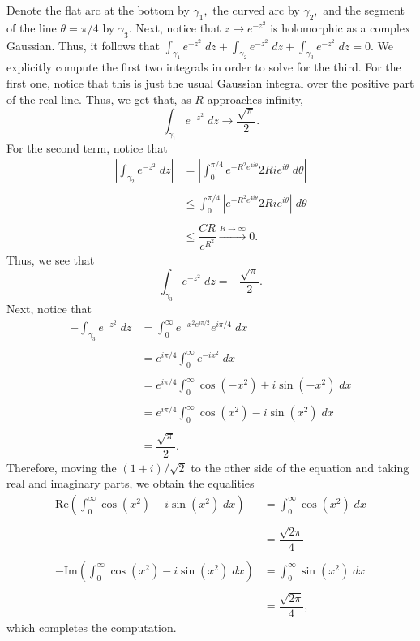 \documentclass[12pt]{article}
\newenvironment{statement}[1]{\smallskip\noindent\color{black}{\bf #1.}}{}
\theoremstyle{definition}
\theoremstyle{remark}
\begin{document}
\begin{statement}{2.1}
Denote the flat arc at the bottom by $\gamma_{1},$ the curved arc by $\gamma_{2},$ and the segment of the line $\theta = \pi/4$ by $\gamma_{3}.$ Next, notice that $z \mapsto e^{-z^{2}}$ is holomorphic as a complex Gaussian. Thus, it follows that $\int_{\gamma_{1}}e^{-z^{2}}\;dz + \int_{\gamma_{2}}e^{-z^{2}}\;dz + \int_{\gamma_{3}}e^{-z^{2}}\;dz = 0.$ We explicitly compute the first two integrals in order to solve for the third. For the first one, notice that this is just the usual Gaussian integral over the positive part of the real line. Thus, we get that, as $R$ approaches infinity, 
\[\int_{\gamma_{1}}e^{-z^{2}}\;dz \to \dfrac{\sqrt{\pi}}{2}.\]
For the second term, notice that
\begin{align*}
\left |\int_{\gamma_{2}}e^{-z^{2}}\;dz\right | &= \left |\int_{0}^{\pi/4}e^{-R^{2}e^{4i\theta}}2Rie^{i\theta}\;d\theta\right | \\\\
&\leq \int_{0}^{\pi/4}\left |e^{-R^{2}e^{4i\theta}}2Rie^{i\theta}\right |\;d\theta \\\\
&\leq \dfrac{CR}{e^{R^{2}}} \xrightarrow{R \to \infty} 0.
\end{align*}
Thus, we see that
\[\int_{\gamma_{3}}e^{-z^{2}}\;dz = -\dfrac{\sqrt{\pi}}{2}.\]
Next, notice that
\begin{align*}
-\int_{\gamma_{3}}e^{-z^{2}}\;dz &= \int_{0}^{\infty}e^{-x^{2}e^{i\pi/2}}e^{i\pi/4}\;dx \\\\
&= e^{i\pi/4}\int_{0}^{\infty}e^{-ix^{2}}\;dx \\\\
&= e^{i\pi/4}\int_{0}^{\infty}\cos(-x^{2}) + i\sin(-x^{2})\;dx \\\\
&= e^{i\pi/4}\int_{0}^{\infty}\cos(x^{2}) - i\sin(x^{2})\;dx \\\\
&= \dfrac{\sqrt{\pi}}{2}.
\end{align*}
Therefore, moving the $(1 + i)/\sqrt{2}$ to the other side of the equation and taking real and imaginary parts, we obtain the equalities
\begin{align*}
\text{Re}\left (\int_{0}^{\infty}\cos(x^{2}) - i\sin(x^{2})\;dx\right ) &= \int_{0}^{\infty}\cos(x^{2})\;dx \\\\
&= \dfrac{\sqrt{2\pi}}{4} \\\\
-\text{Im}\left (\int_{0}^{\infty}\cos(x^{2}) - i\sin(x^{2})\;dx\right ) &= \int_{0}^{\infty}\sin(x^{2})\;dx \\\\
&= \dfrac{\sqrt{2\pi}}{4},
\end{align*}
which completes the computation.
\end{statement}
\end{document}
